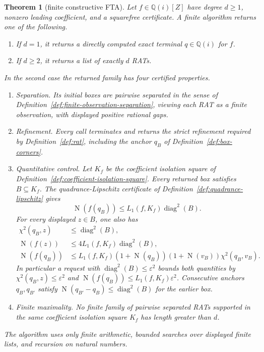 \documentclass[11pt]{article}
\newtheorem{theorem}{Theorem}[section]
\newcommand{\Qi}{\mathbb{Q}(i)}
\newcommand{\Norm}[1]{\operatorname{N}\!\left(#1\right)}
\newcommand{\diamq}{\operatorname{diag}^{2}}
\newcommand{\eps}{\varepsilon}
\newcommand{\Defref}[1]{Definition~\ref{#1}}
\begin{document}
\begin{theorem}[finite constructive FTA]
\label{thm:main}
Let $f\in\Qi[Z]$ have degree $d\ge1$, nonzero leading coefficient, and a
squarefree certificate.  A finite algorithm returns one of the following.
\begin{enumerate}[label=(\roman*)]
\item If $d=1$, it returns a directly computed exact terminal $q\in\Qi$ for
$f$.
\item If $d\ge2$, it returns a list of exactly $d$ RATs.
\end{enumerate}
In the second case the returned family has four certified properties.
\begin{enumerate}[label=(\alph*)]
\item \emph{Separation.}  Its initial boxes are pairwise separated in the
sense of \Defref{def:finite-observation-separation}, viewing each RAT as a
finite observation, with displayed positive rational gaps.
\item \emph{Refinement.}  Every call terminates and returns the strict
refinement required by \Defref{def:rat}, including the anchor $q_B$ of
\Defref{def:box-corners}.
\item \emph{Quantitative control.}  Let $K_f$ be the coefficient isolation
square of \Defref{def:coefficient-isolation-square}.  Every returned box
satisfies $B\subseteq K_f$.  The quadrance-Lipschitz certificate of
\Defref{def:quadrance-lipschitz} gives
\[
             \Norm{f(q_B)}\le L_1(f,K_f)\diamq(B).
\]
For every displayed $z\in B$, one also has
\[
 \begin{aligned}
 \chi^2(q_B,z)&\le\diamq(B),\\
 \Norm{f(z)}&\le4L_1(f,K_f)\diamq(B),\\
 \Norm{f(q_B)}&\le
 L_1(f,K_f)(1+\Norm{q_B})(1+\Norm{v_B})\chi^2(q_B,v_B).
 \end{aligned}
\]
In particular a request with $\diamq(B)\le\eps^2$ bounds both quantities by
$\chi^2(q_B,z)\le\eps^2$ and
$\Norm{f(q_B)}\le L_1(f,K_f)\eps^2$.  Consecutive anchors $q_B,q_{B'}$ satisfy
$\Norm{q_{B'}-q_B}\le\diamq(B)$ for the earlier box.
\item \emph{Finite maximality.}  No finite family of pairwise separated RATs
supported in the same coefficient isolation square $K_f$ has length greater
than $d$.
\end{enumerate}
The algorithm uses only finite arithmetic, bounded searches over displayed
finite lists, and recursion on natural numbers.
\end{theorem}
\end{document}
